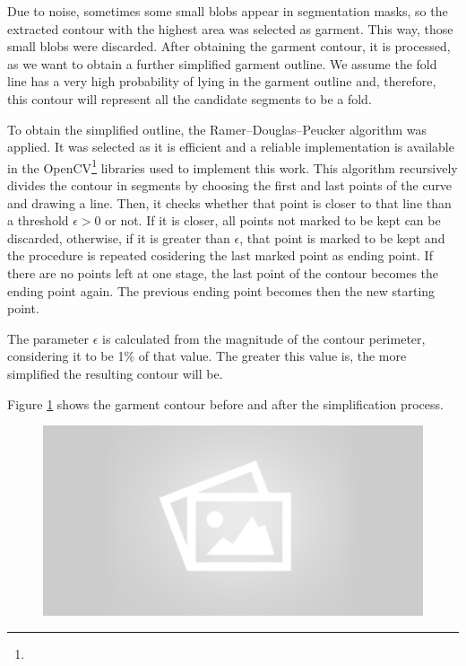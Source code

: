 Due to noise, sometimes some small blobs appear in segmentation masks, so the extracted contour with the highest area was selected as garment. This way, those small blobs were discarded.
After obtaining the garment contour, it is processed, as we want to obtain a further simplified garment outline. We assume the fold line has a very high probability of lying in the garment outline and, therefore, this contour will represent all the candidate segments to be a fold. 

To obtain the simplified outline, the Ramer–Douglas–Peucker algorithm  was applied. It was selected as it is efficient and a reliable implementation is available in the OpenCV\footnote{} libraries used to implement this work. This algorithm recursively divides the contour in segments by choosing the first and last points of the curve and drawing a line. Then, it checks whether that point is closer to that line than a threshold $\epsilon > 0$ or not. If it is closer, all points not marked to be kept can be discarded, otherwise, if it is greater than $\epsilon$, that point is marked to be kept and the procedure is repeated cosidering the last marked point as ending point. If there are no points left at one stage, the last point of the contour becomes the ending point again. The previous ending point becomes then the new starting point.

The parameter $\epsilon$ is calculated from the magnitude of the contour perimeter, considering it to be 1\% of that value. The greater this value is, the more simplified the resulting contour will be.

Figure \ref{fig:contour_and_simplified_contour} shows the garment contour before and after the simplification process.

\begin{figure}[thpb]
    \centering
    \includegraphics[width=0.9
    \textwidth]{figures/placeholder2.png}
    \caption{}
    \label{fig:contour_and_simplified_contour}
\end{figure}
